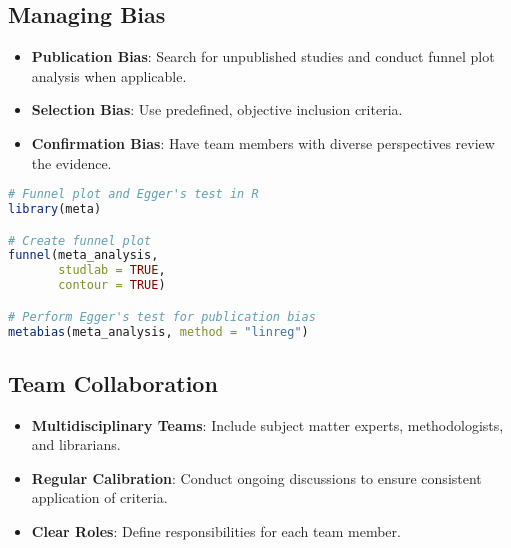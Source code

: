 \subsection{Managing Bias}

\begin{itemize}
    \item \textbf{Publication Bias}: Search for unpublished studies and conduct funnel plot analysis when applicable.
    \item \textbf{Selection Bias}: Use predefined, objective inclusion criteria.
    \item \textbf{Confirmation Bias}: Have team members with diverse perspectives review the evidence.
\end{itemize}


\begin{commandbox}
\begin{lstlisting}[language=R]
# Funnel plot and Egger's test in R
library(meta)

# Create funnel plot
funnel(meta_analysis,
       studlab = TRUE,
       contour = TRUE)

# Perform Egger's test for publication bias
metabias(meta_analysis, method = "linreg")
\end{lstlisting}
\end{commandbox}

\subsection{Team Collaboration}

\begin{itemize}
    \item \textbf{Multidisciplinary Teams}: Include subject matter experts, methodologists, and librarians.
    \item \textbf{Regular Calibration}: Conduct ongoing discussions to ensure consistent application of criteria.
    \item \textbf{Clear Roles}: Define responsibilities for each team member.
\end{itemize}


